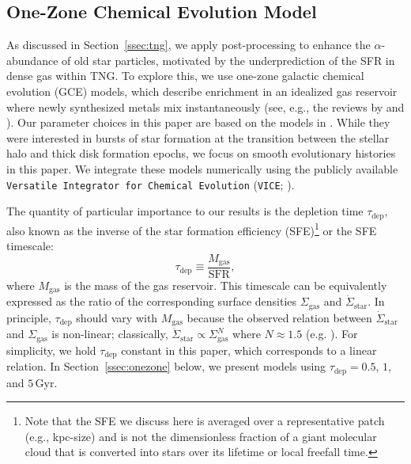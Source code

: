 \documentclass[twocolumn,linenumbers]{aastex631}
\newcommand{\Gyr}{\ensuremath{\textrm{Gyr}}}
\newcommand{\SFR}{\ensuremath{\textrm{SFR}}}
\begin{document}
\subsection{One-Zone Chemical Evolution Model}\label{ssec:onezone_met}
As discussed in Section~\ref{ssec:tng}, we apply post-processing to enhance the $\alpha$-abundance of old star particles, motivated by the underprediction of the SFR in dense gas within TNG. To explore this, we use one-zone galactic chemical evolution (GCE) models, which describe enrichment in an idealized gas reservoir where newly synthesized metals mix instantaneously (see, e.g., the reviews by \citealt{Tinsley1980} and \citealt{Matteucci2021}). Our parameter choices in this paper are based on the models in \citet{2022arXiv220402989C}. While they were interested in bursts of star formation at the transition between the stellar halo and thick disk formation epochs, we focus on smooth evolutionary histories in this paper. We integrate these models numerically using the publicly available {\tt Versatile Integrator for Chemical Evolution} ({\tt VICE}; \citealt{2020MNRAS.498.1364J}).

The quantity of particular importance to our results is the depletion time $\tau_{\textrm{dep}}$, also known as the inverse of the star formation efficiency (SFE)\footnote{Note that the SFE we discuss here is averaged over a representative patch (e.g., kpc-size) and is not the dimensionless fraction of a giant molecular cloud that is converted into stars over its lifetime or local freefall time.} or the SFE timescale:
\begin{equation}
\tau_{\textrm{dep}} \equiv \frac{M_{\textrm{gas}}}{\SFR},
\end{equation}
where $M_{\textrm{gas}}$ is the mass of the gas reservoir. This timescale can be equivalently expressed as the ratio of the corresponding surface densities $\Sigma_{\textrm{gas}}$ and $\dot{\Sigma}_{\textrm{star}}$. In principle, $\tau_{\textrm{dep}}$ should vary with $M_{\textrm{gas}}$ because the observed relation between $\dot{\Sigma}_{\textrm{star}}$ and $\Sigma_{\textrm{gas}}$ is non-linear; classically, $\dot{\Sigma}_{\textrm{star}} \propto \Sigma_{\textrm{gas}}^N$ where $N \approx 1.5$ (e.g. \citealt{Schmidt1959, Kennicutt1998}). For simplicity, we hold $\tau_{\textrm{dep}}$ constant in this paper, which corresponds to a linear relation. In Section~\ref{ssec:onezone} below, we present models using $\tau_{\textrm{dep}} = 0.5$, $1$, and $5\,\Gyr$.
\end{document}
